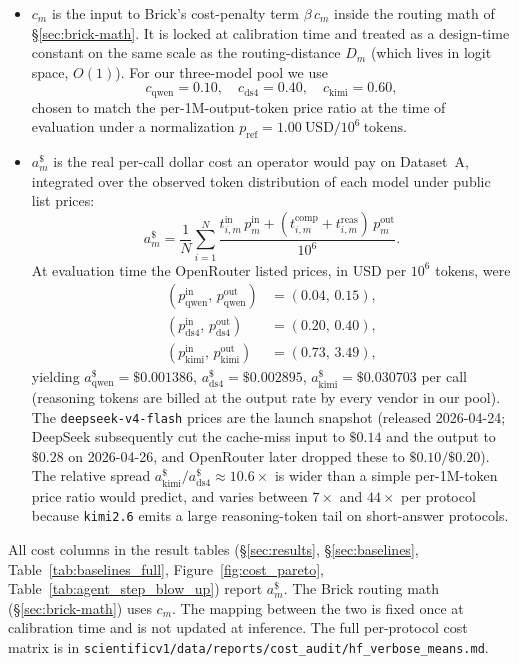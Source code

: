 \documentclass[twocolumn,10pt,a4paper]{article}
\begin{document}
\begin{itemize}\setlength{\itemsep}{2pt}
\item $c_m$ is the input to Brick's cost-penalty term $\beta\,c_m$ inside the routing math of §\ref{sec:brick-math}. It is locked at calibration time and treated as a design-time constant on the same scale as the routing-distance $D_m$ (which lives in logit space, $O(1)$). For our three-model pool we use
\[
  c_{\text{qwen}}{=}0.10,\quad c_{\text{ds4}}{=}0.40,\quad c_{\text{kimi}}{=}0.60,
\]
chosen to match the per-1M-output-token price ratio at the time of evaluation under a normalization $p_{\mathrm{ref}}{=}1.00\ \text{USD}/10^6\ \text{tokens}$.
\item $a_m^{\$}$ is the real per-call dollar cost an operator would pay on Dataset~A, integrated over the observed token distribution of each model under public list prices:
\[
  a_m^{\$} = \frac{1}{N}\sum_{i=1}^{N} \frac{t^{\text{in}}_{i,m}\, p^{\text{in}}_m + (t^{\text{comp}}_{i,m} + t^{\text{reas}}_{i,m})\, p^{\text{out}}_m}{10^6}.
\]
At evaluation time the OpenRouter listed prices, in USD per $10^6$ tokens, were
\begin{align*}
  (p^{\text{in}}_{\text{qwen}},\, p^{\text{out}}_{\text{qwen}}) &= (0.04,\, 0.15), \\
  (p^{\text{in}}_{\text{ds4}},\, p^{\text{out}}_{\text{ds4}}) &= (0.20,\, 0.40), \\
  (p^{\text{in}}_{\text{kimi}},\, p^{\text{out}}_{\text{kimi}}) &= (0.73,\, 3.49),
\end{align*}
yielding $a_{\text{qwen}}^{\$}{=}\$0.001386$, $a_{\text{ds4}}^{\$}{=}\$0.002895$, $a_{\text{kimi}}^{\$}{=}\$0.030703$ per call (reasoning tokens are billed at the output rate by every vendor in our pool). The \texttt{deepseek-v4-flash} prices are the launch snapshot (released 2026-04-24; DeepSeek subsequently cut the cache-miss input to $\$0.14$ and the output to $\$0.28$ on 2026-04-26, and OpenRouter later dropped these to $\$0.10/\$0.20$). The relative spread $a_{\text{kimi}}^{\$}/a_{\text{ds4}}^{\$}\approx 10.6{\times}$ is wider than a simple per-1M-token price ratio would predict, and varies between $7{\times}$ and $44{\times}$ per protocol because \texttt{kimi2.6} emits a large reasoning-token tail on short-answer protocols.
\end{itemize}

All cost columns in the result tables (§\ref{sec:results}, §\ref{sec:baselines}, Table~\ref{tab:baselines_full}, Figure~\ref{fig:cost_pareto}, Table~\ref{tab:agent_step_blow_up}) report $a_m^{\$}$. The Brick routing math (§\ref{sec:brick-math}) uses $c_m$. The mapping between the two is fixed once at calibration time and is not updated at inference. The full per-protocol cost matrix is in \texttt{scientificv1/data/reports/cost\_audit/hf\_verbose\_means.md}.
\end{document}
